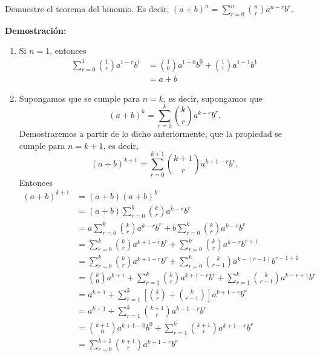 \newpage

\begin{myexample}
    Demuestre el teorema del binomio. Es decir, $\displaystyle (a+b)^n=\sum_{r=0}^{n}\binom{n}{r}a^{n-r}b^r$.
    
    \tcblower
    \textbf{\color{jblueleft}Demostración:}
    \begin{enumerate}[label=\roman*)]
        \item Si $n=1$, entonces
        \begin{align*}
            \sum_{r=0}^{1}\binom{1}{r}a^{1-r}b^r &= \binom{1}{0} a^{1-0}b^0 + \binom{1}{1} a^{1-1}b^1 \\
            &=a+b
        \end{align*}
        \item Supongamos que se cumple para $n=k$, es decir, supongamos que
        $$(a+b)^k=\sum_{r=0}^{k}\binom{k}{r}a^{k-r}b^r.$$
        Demostraremos a partir de lo dicho anteriormente, que la propiedad se cumple para $n=k+1$, es decir,
        $$(a+b)^{k+1} = \sum_{r=0}^{k+1}\binom{k+1}{r}a^{k+1-r}b^r.$$
        Entonces
        \begin{align*}
            (a+b)^{k+1} &=(a+b)(a+b)^k \\
            &=(a+b) \sum_{r=0}^{k} \binom{k}{r} a^{k-r}b^r \\
            &=a\sum_{r=0}^{k} \binom{k}{r} a^{k-r}b^r + b \sum_{r=0}^{k} \binom{k}{r} a^{k-r}b^r \\
            &=\sum_{r=0}^{k} \binom{k}{r} a^{k+1-r}b^r +  \sum_{r=0}^{k} \binom{k}{r} a^{k-r}b^{r+1} \\
            &=\sum_{r=0}^{k} \binom{k}{r} a^{k+1-r}b^r +  \sum_{r=0}^{k} \binom{k}{r-1} a^{k-(r-1)}b^{r-1+1} \\
            &=\binom{k}{0} a^{k+1} + \sum_{r=1}^{k} \binom{k}{r} a^{k+1-r}b^r + \sum_{r=1}^{k} \binom{k}{r-1} a^{k-r+1}b^r \\
            &= a^{k+1} + \sum_{r=1}^{k} \left[ \binom{k}{r}+\binom{k}{r-1} \right] a^{k+1-r}b^r \\
            &=a^{k+1}+\sum_{r=1}^{k} \binom{k+1}{r} a^{k+1-r} b^r \\
            &=\binom{k+1}{0}a^{k+1-0}b^0+\sum_{r=1}^{k} \binom{k+1}{r} a^{k+1-r}b^r \\
            &=\sum_{r=0}^{k+1} \binom{k+1}{r}a^{k+1-r}b^r
        \end{align*}
    \end{enumerate}
\end{myexample}

